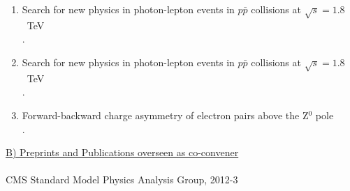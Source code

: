 \documentclass [12pt]{report}
\begin{document}
\begin{enumerate}

\item Search for new physics in photon-lepton events in $p\bar{p}$ collisions at $\sqrt{s} = 1.8$~TeV\\
.

\item Search for new physics in photon-lepton events in $p\bar{p}$ collisions at $\sqrt{s} = 1.8$~TeV\\
.

\item Forward-backward charge asymmetry of electron pairs above the Z$^0$ pole\\
.

\end{enumerate}
 
\noindent\underline{B) Preprints and Publications overseen as co-convener}
\\ \\
CMS Standard Model Physics Analysis Group, 2012-3
\end{document}
